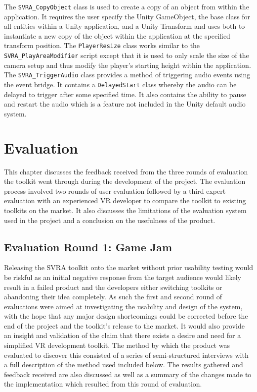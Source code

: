 \documentclass{l4proj}
\begin{document}
The \texttt{SVRA\_CopyObject} class is used to create a copy of an object from within the application. It requires the user specify the Unity GameObject, the base class for all entities within a Unity application, and a Unity Transform and uses both to instantiate a new copy of the object within the application at the specified transform position. The \texttt{PlayerResize} class works similar to the \texttt{SVRA\_PlayAreaModifier} script except that it is used to only scale the size of the camera setup and thus modify the player's starting height within the application. The \texttt{SVRA\_TriggerAudio} class provides a method of triggering audio events using the event bridge. It contains a \texttt{DelayedStart} class whereby the audio can be delayed to trigger after some specified time. It also contains the ability to pause and restart the audio which is a feature not included in the Unity default audio system.

\chapter{Evaluation}
\label{sec:evaluationchapter}
This chapter discusses the feedback received from the three rounds of evaluation the toolkit went through during the development of the project. The evaluation process involved two rounds of user evaluation followed by a third expert evaluation with an experienced VR developer to compare the toolkit to existing toolkits on the market. It also discusses the limitations of the evaluation system used in the project and a conclusion on the usefulness of the product.

\section{Evaluation Round 1: Game Jam}
\label{sec:evaluationround1}
Releasing the SVRA toolkit onto the market without prior usability testing would be riskful as an initial negative response from the target audience would likely result in a failed product and the developers either switching toolkits or abandoning their idea completely. As such the first and second round of evaluations were aimed at investigating the usability and design of the system, with the hope that any major design shortcomings could be corrected before the end of the project and the toolkit's release to the market. It would also provide an insight and validation of the claim that there exists a desire and need for a simplified VR development toolkit. The method by which the product was evaluated to discover this consisted of a series of semi-structured interviews with a full description of the method used included below. The results gathered and feedback received are also discussed as well as a summary of the changes made to the implementation which resulted from this round of evaluation. 
\end{document}
